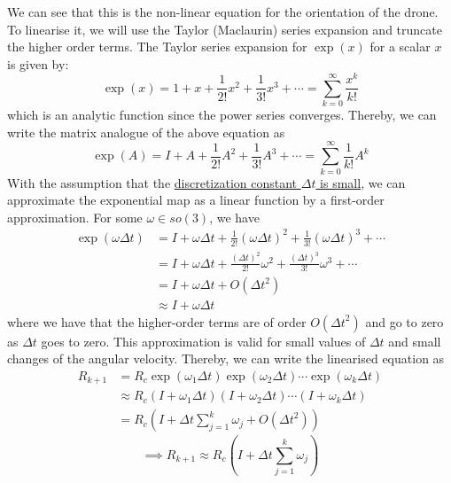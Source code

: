 We can see that this is the non-linear equation for the orientation of the drone.
To linearise it, we will use the Taylor (Maclaurin) series expansion and truncate the higher order terms.
The Taylor series expansion for \( \exp(x) \) for a scalar \( x \) is given by:
\begin{equation*}
    \exp(x)
    =
    1 + x + \frac{1}{2!} x^2 + \frac{1}{3!} x^3 + \cdots
    =
    \sum_{k=0}^{\infty} \frac{x^k}{k!}
\end{equation*}
which is an analytic function since the power series converges.
Thereby, we can write the matrix analogue of the above equation as
\begin{equation*}
    \exp(A)
    =
    I + A + \frac{1}{2!} A^2 + \frac{1}{3!} A^3 + \cdots
    =
    \sum_{k=0}^{\infty} \frac{1}{k!} A^k
\end{equation*}
With the assumption that the \underline{discretization constant \( \Delta t \) is small}, we can approximate the exponential map as a linear function by a first-order approximation.
For some \( \omega \in so(3)\), we have
\begin{align*}
    \exp(\omega \Delta t)
     & =
    I + \omega \Delta t + \frac{1}{2!} {(\omega \Delta t)}^2 + \frac{1}{3!} {(\omega \Delta t)}^3 + \cdots
    \\ & =
    I + \omega \Delta t + \frac{{(\Delta t)}^2}{2!} \omega^2 + \frac{{(\Delta t)}^3}{3!} \omega^3 + \cdots
    \\ & =
    I + \omega \Delta t + O({\Delta t}^2)
    \\
     & \approx
    I + \omega \Delta t
\end{align*}
where we have that the higher-order terms are of order \( O({\Delta t}^2) \) and go to zero as \( \Delta t \) goes to zero.
This approximation is valid for small values of \( \Delta t \) and small changes of the angular velocity.
Thereby, we can write the linearised equation as
\begin{align*}
    R_{k+1}
     & =
    R_c \exp(\omega_1 \Delta t) \exp(\omega_2 \Delta t) \cdots \exp(\omega_k \Delta t)
    \\ & \approx
    R_c (I + \omega_1 \Delta t) (I + \omega_2 \Delta t) \cdots (I + \omega_k \Delta t)
    \\ & =
    R_c \left( I + \Delta t \sum_{j=1}^{k} \omega_j + O({\Delta t}^2) \right)
\end{align*}
\begin{equation*}
    \implies
    \boxed{
        R_{k+1}
        \approx
        R_c \left( I + \Delta t \sum_{j=1}^{k} \omega_j \right)
    }
\end{equation*}

